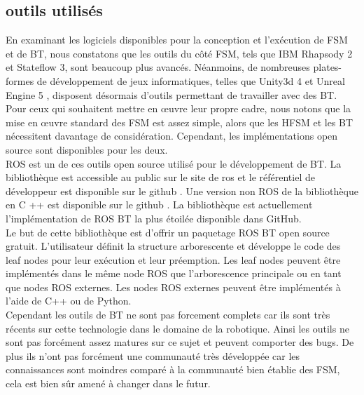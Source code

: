 \documentclass[titlepage]{article}
\begin{document}
		\subsection{outils utilisés}
			En examinant les logiciels disponibles pour la conception et l'exécution de FSM et de BT, nous constatons que les outils du côté FSM, tels que IBM Rhapsody 2 et Stateflow 3, sont beaucoup plus avancés. Néanmoins, de nombreuses plates-formes de développement de jeux informatiques, telles que Unity3d 4\cite{technologies} et Unreal Engine 5 \cite{unreal_engine}, disposent désormais d'outils permettant de travailler avec des BT. Pour ceux qui souhaitent mettre en œuvre leur propre cadre, nous notons que la mise en œuvre standard des FSM est assez simple, alors que les HFSM et les BT nécessitent davantage de considération. Cependant, les implémentations open source sont disponibles pour les deux.
			\\
			ROS est un de ces outils open source utilisé pour le développement de BT.
			La bibliothèque est accessible au public sur le site de ros \cite{ros.org} et le référentiel de développeur est disponible sur le github \cite{miccol_2018_dev}. Une version non ROS de la bibliothèque en C ++ est disponible sur le github \cite{miccol_2018}. La bibliothèque est actuellement l’implémentation de ROS BT la plus étoilée disponible dans GitHub.
			\\
			Le but de cette bibliothèque est d’offrir un paquetage ROS BT open source gratuit. L'utilisateur définit la structure arborescente et développe le code des leaf nodes pour leur exécution et leur préemption. Les leaf nodes peuvent être implémentés dans le même node ROS que l'arborescence principale ou en tant que nodes ROS externes. Les nodes ROS externes peuvent être implémentés à l'aide de C++ ou de Python.
			\\
			Cependant les outils de BT ne sont pas forcement complets car ils sont très récents sur cette technologie dans le domaine de la robotique. Ainsi les outils ne sont pas forcément assez matures sur ce sujet et peuvent comporter des bugs. De plus ils n'ont pas forcément une communauté très développée car les connaissances sont moindres comparé à la communauté bien établie des FSM, cela est bien sûr amené à changer dans le futur.
\end{document}
